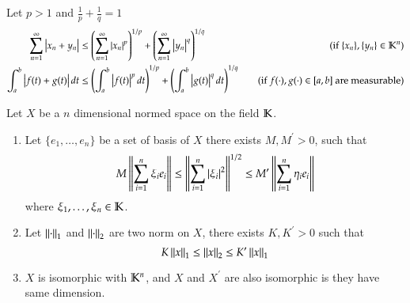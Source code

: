 \begin{theorem}\label{thm:1.21}
Let $p > 1$ and $\frac{1}{p} + \frac{1}{q} = 1$
\begin{equation}
    \begin{aligned}
        \sum_{n=1}^{\infty}\left|x_n + y_n\right| &\leq \left(\sum_{n=1}^{\infty}\left|x_n\right|^p\right)^{1/p} + \left(\sum_{n=1}^{\infty}\left|y_n\right|^q\right)^{1/q} \quad &\text{(if $\{x_n\}, \{y_n\} \in \mathbb{K}^n$)}\\
        \int_{a}^{b} \left|f(t) + g(t)\right| dt &\leq \left(\int_{a}^{b} \left|f(t)\right|^p dt\right)^{1/p} + \left(\int_{a}^{b} \left|g(t)\right|^q dt\right)^{1/q} \quad &\text{(if $f(\cdot),g(\cdot) \in [a, b]$ are measurable)}
    \end{aligned}
\end{equation}
\end{theorem}

\begin{theorem}\label{thm:1.22}
Let $X$ be a $n$ dimensional normed space on the field $\mathbb{K}$. 
\begin{enumerate}[itemsep=0pt, topsep=0pt]
    \item Let $\{e_1, \dots, e_n\}$ be a set of basis of $X$ there exists $M, M^{\prime} > 0$, such that 
          \begin{equation*}
              M \Norm{\sum\limits_{i=1}^{n} \xi_i e_i} \leq \Norm{\sum\limits_{i=1}^{n} \Abs{\xi_i}^2}^{1/2} \leq M^{\prime}\Norm{\sum\limits_{i=1}^{n} \eta_i e_i}
          \end{equation*}
          where $\xi_1, \dots, \xi_n \in \mathbb{K}$.
    \item Let $\Norm{\cdot}_1$ and $\Norm{\cdot}_2$ are two norm on $X$, there exists $K, K^{\prime} > 0$       such that 
          \begin{equation*}
              K \Norm{x}_1 \leq \Norm{x}_2 \leq K^{\prime}\Norm{x}_1
          \end{equation*}
    \item $X$ is isomorphic with $\mathbb{K}^n$, and $X$ and $X^{\prime}$ are also isomorphic is they have same dimension.
\end{enumerate}
\end{theorem}